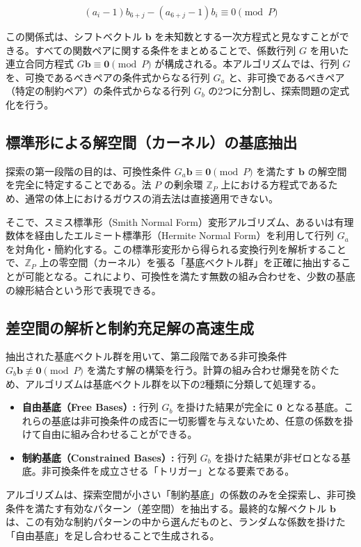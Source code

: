 \documentclass[a4paper,11pt,dvipdfmx]{jsarticle}
\theoremstyle{definition}
\begin{document}
$$ (a_i - 1)b_{6+j} - (a_{6+j} - 1)b_i \equiv 0 \pmod P $$

この関係式は、シフトベクトル $\boldsymbol{b}$ を未知数とする一次方程式と見なすことができる。すべての関数ペアに関する条件をまとめることで、係数行列 $G$ を用いた連立合同方程式 $G \boldsymbol{b} \equiv \boldsymbol{0} \pmod P$ が構成される。本アルゴリズムでは、行列 $G$ を、可換であるべきペアの条件式からなる行列 $G_a$ と、非可換であるべきペア（特定の制約ペア）の条件式からなる行列 $G_b$ の2つに分割し、探索問題の定式化を行う。

\subsection{標準形による解空間（カーネル）の基底抽出}
探索の第一段階の目的は、可換性条件 $G_a \boldsymbol{b} \equiv \boldsymbol{0} \pmod P$ を満たす $\boldsymbol{b}$ の解空間を完全に特定することである。法 $P$ の剰余環 $\mathbb{Z}_P$ 上における方程式であるため、通常の体上におけるガウスの消去法は直接適用できない。

そこで、スミス標準形（Smith Normal Form）変形アルゴリズム、あるいは有理数体を経由したエルミート標準形（Hermite Normal Form）を利用して行列 $G_a$ を対角化・簡約化する。この標準形変形から得られる変換行列を解析することで、$\mathbb{Z}_P$ 上の零空間（カーネル）を張る「基底ベクトル群」を正確に抽出することが可能となる。これにより、可換性を満たす無数の組み合わせを、少数の基底の線形結合という形で表現できる。

\subsection{差空間の解析と制約充足解の高速生成}
抽出された基底ベクトル群を用いて、第二段階である非可換条件 $G_b \boldsymbol{b} \not\equiv \boldsymbol{0} \pmod P$ を満たす解の構築を行う。計算の組み合わせ爆発を防ぐため、アルゴリズムは基底ベクトル群を以下の2種類に分類して処理する。

\begin{itemize}
    \item \textbf{自由基底（Free Bases）:} 行列 $G_b$ を掛けた結果が完全に $\boldsymbol{0}$ となる基底。これらの基底は非可換条件の成否に一切影響を与えないため、任意の係数を掛けて自由に組み合わせることができる。
    \item \textbf{制約基底（Constrained Bases）:} 行列 $G_b$ を掛けた結果が非ゼロとなる基底。非可換条件を成立させる「トリガー」となる要素である。
\end{itemize}

アルゴリズムは、探索空間が小さい「制約基底」の係数のみを全探索し、非可換条件を満たす有効なパターン（差空間）を抽出する。最終的な解ベクトル $\boldsymbol{b}$ は、この有効な制約パターンの中から選んだものと、ランダムな係数を掛けた「自由基底」を足し合わせることで生成される。
\end{document}
